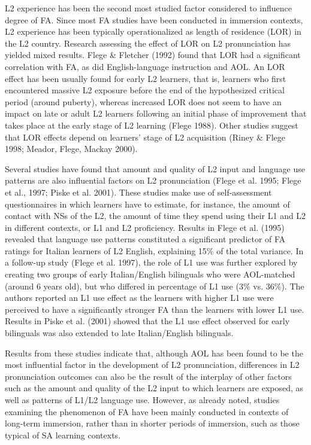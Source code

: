 \documentclass[12pt]{article}
\newenvironment{styleStandard}{\setlength\leftskip{0cm}\setlength\rightskip{0cm plus 1fil}\setlength\parindent{0cm}\setlength\parfillskip{0pt plus 1fil}\setlength\parskip{0in plus 1pt}\writerlistparindent\writerlistleftskip\leavevmode\normalfont\normalsize\writerlistlabel\ignorespaces}{\unskip\vspace{0.111in plus 0.0111in}\par}
\newcommand\writerlistleftskip{}
\newcommand\writerlistparindent{}
\newcommand\writerlistlabel{}
\begin{document}
\begin{styleStandard}
L2 experience has been the second most studied factor considered to influence degree of FA. Since most FA studies have been conducted in immersion contexts, L2 experience has been typically operationalized as length of residence (LOR) in the L2 country. Research assessing the effect of LOR on L2 pronunciation has yielded mixed results. Flege \& Fletcher (1992) found that LOR had a significant correlation with FA, as did English-language instruction and AOL. An LOR effect has been usually found for early L2 learners, that is, learners who first encountered massive L2 exposure before the end of the hypothesized critical period (around puberty), whereas increased LOR does not seem to have an impact on late or adult L2 learners following an initial phase of improvement that takes place at the early stage of L2 learning (Flege 1988). Other studies suggest that LOR effects depend on learners’ stage of L2 acquisition (Riney \& Flege 1998; Meador, Flege, Mackay 2000).
\end{styleStandard}

\begin{styleStandard}
Several studies have found that amount and quality of L2 input and language use patterns are also influential factors on L2 pronunciation (Flege et al. 1995; Flege et al., 1997; Piske et al. 2001). These studies make use of self-assessment questionnaires in which learners have to estimate, for instance, the amount of contact with NSs of the L2, the amount of time they spend using their L1 and L2 in different contexts, or L1 and L2 proficiency. Results in Flege et al. (1995) revealed that language use patterns constituted a significant predictor of FA ratings for Italian learners of L2 English, explaining 15\% of the total variance. In a follow-up study (Flege et al. 1997), the role of L1 use was further explored by creating two groups of early Italian/English bilinguals who were AOL-matched (around 6 years old), but who differed in percentage of L1 use (3\% vs. 36\%). The authors reported an L1 use effect as the learners with higher L1 use were perceived to have a significantly stronger FA than the learners with lower L1 use. Results in Piske et al. (2001) showed that the L1 use effect observed for early bilinguals was also extended to late Italian/English bilinguals.
\end{styleStandard}

\begin{styleStandard}
Results from these studies indicate that, although AOL has been found to be the most influential factor in the development of L2 pronunciation, differences in L2 pronunciation outcomes can also be the result of the interplay of other factors such as the amount and quality of the L2 input to which learners are exposed, as well as patterns of L1/L2 language use. However, as already noted, studies examining the phenomenon of FA have been mainly conducted in contexts of long-term immersion, rather than in shorter periods of immersion, such as those typical of SA learning contexts.
\end{styleStandard}
\end{document}
